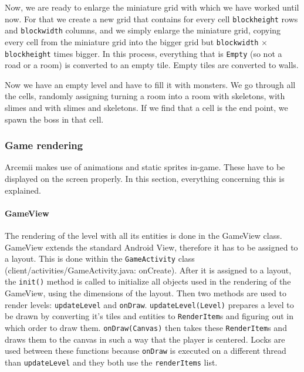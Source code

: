 \documentclass[../main.tex]{subfiles}
\begin{document}
		Now, we are ready to enlarge the miniature grid with which we have worked until now. For that we create a new grid that contains for every cell \texttt{blockheight} rows and \texttt{blockwidth} columns, and we simply enlarge the miniature grid, copying every cell from the miniature grid into the bigger grid but \texttt{blockwidth} $\times$ \texttt{blockheight} times bigger. In this process, everything that is \texttt{Empty} (so not a road or a room) is converted to an empty tile. Empty tiles are converted to walls.
		
			Now we have an empty level and have to fill it with monsters. We go through all the cells, randomly assigning turning a room into a room with skeletons, with slimes and with slimes and skeletons. If we find that a cell is the end point, we spawn the boss in that cell.
		\subsubsection{Game rendering}
		Arcemii makes use of animations and static sprites in-game. These have to be displayed on the screen properly. In this section, everything concerning this is explained.
		\paragraph{GameView}
		The rendering of the level with all its entities is done in the GameView class. GameView extends the standard Android View, therefore it has to be assigned to a layout. This is done within the \texttt{GameActivity} class (\tiny client/activities/GameActivity.java: onCreate\normalsize). After it is assigned to a layout, the \texttt{init()} method is called to initialize all objects used in the rendering of the GameView, using the dimensions of the layout. Then two methods are used to render levels: \texttt{updateLevel} and \texttt{onDraw}. \texttt{updateLevel(Level)} prepares a level to be drawn by converting it's tiles and entities to \texttt{RenderItem}s and figuring out in which order to draw them. \texttt{onDraw(Canvas)} then takes these \texttt{RenderItem}s and draws them to the canvas in such a way that the player is centered. Locks are used between these functions because \texttt{onDraw} is executed on a different thread than \texttt{updateLevel} and they both use the \texttt{renderItems} list.
\end{document}
